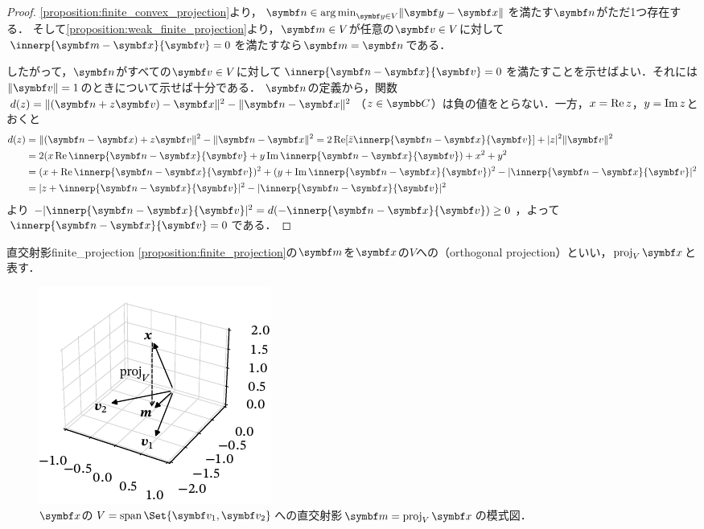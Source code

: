 \documentclass[../../main]{subfiles}
\begin{document}
\begin{proof}
  \cref{proposition:finite_convex_projection}より，\(\vect{n}\in\argmin_{\vect{y}\in V}\vnorm{\vect{y}-\vect{x}}\)を満たす\(\vect{n}\)がただ1つ存在する．
  そして\cref{proposition:weak_finite_projection}より，\(\vect{m}\in V\)が任意の\(\vect{v}\in V\)に対して\(\innerp{\vect{m}-\vect{x}}{\vect{v}}=0\)を満たすなら\(\vect{m}=\vect{n}\)である．

  したがって，\(\vect{n}\)がすべての\(\vect{v}\in V\)に対して\(\innerp{\vect{n}-\vect{x}}{\vect{v}}=0\)を満たすことを示せばよい．それには\(\vnorm{\vect{v}}=1\)のときについて示せば十分である．
  \(\vect{n}\)の定義から，関数\(d(z)=\vnorm{(\vect{n}+z\vect{v})-\vect{x}}^2-\vnorm{\vect{n}-\vect{x}}^2\)（\(z\in\numset{C}\)）は負の値をとらない．一方，\(x=\operatorname{Re} z\)，\(y=\operatorname{Im} z\)とおくと
  \begin{align*}
    d(z) &= \vnorm{(\vect{n}-\vect{x})+z\vect{v}}^2-\vnorm{\vect{n}-\vect{x}}^2
    = 2\rpart[\conj{z}\innerp{\vect{n}-\vect{x}}{\vect{v}}]+\abs{z}^2\vnorm{\vect{v}}^2 \\
    &= 2(x\rpart\innerp{\vect{n}-\vect{x}}{\vect{v}}+y\ipart\innerp{\vect{n}-\vect{x}}{\vect{v}})+x^2+y^2 \\
    &= (x+\rpart\innerp{\vect{n}-\vect{x}}{\vect{v}})^2+(y+\ipart\innerp{\vect{n}-\vect{x}}{\vect{v}})^2-\abs{\innerp{\vect{n}-\vect{x}}{\vect{v}}}^2 \\
    &= \abs{z+\innerp{\vect{n}-\vect{x}}{\vect{v}}}^2-\abs{\innerp{\vect{n}-\vect{x}}{\vect{v}}}^2
  \end{align*}
  より\(-\abs{\innerp{\vect{n}-\vect{x}}{\vect{v}}}^2=d(-\innerp{\vect{n}-\vect{x}}{\vect{v}})\geq 0\)，よって\(\innerp{\vect{n}-\vect{x}}{\vect{v}}=0\)である．
\end{proof}

\begin{definition}{直交射影}{finite_projection}
  \cref{proposition:finite_projection}の\(\vect{m}\)を\(\vect{x}\)の\(V\)への（orthogonal projection）といい，\(\proj_V\vect{x}\)と表す．
\end{definition}

\begin{figure}[htbp]
  \centering
  \includegraphics{figures/proj3d.pdf}
  \caption{\(\vect{x}\)の\(V=\spannedby\Set{\vect{v}_1,\vect{v}_2}\)への直交射影\(\vect{m}=\proj_V\vect{x}\)の模式図．}
\end{figure}
\end{document}
